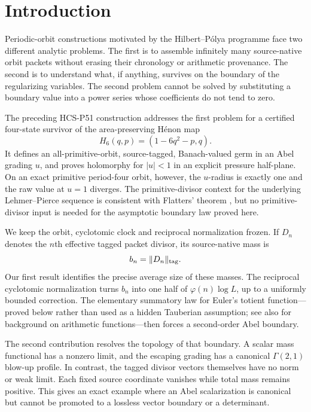 \section{Introduction}

Periodic-orbit constructions motivated by the Hilbert--P\'olya programme face
two different analytic problems.  The first is to assemble infinitely many
source-native orbit packets without erasing their chronology or arithmetic
provenance.  The second is to understand what, if anything, survives on the
boundary of the regularizing variables.  The second problem cannot be solved
by substituting a boundary value into a power series whose coefficients do
not tend to zero.

The preceding HCS-P51 construction \cite{wangp51} addresses the first problem
for a certified four-state survivor of the area-preserving H\'enon map
\[
H_6(q,p)=(1-6q^2-p,q).
\]
It defines an all-primitive-orbit, source-tagged, Banach-valued germ in an
Abel grading $u$, and proves holomorphy for $|u|<1$ in an explicit pressure
half-plane.  On an exact primitive period-four orbit, however, the $u$-radius
is exactly one and the raw value at $u=1$ diverges.  The primitive-divisor
context for the underlying Lehmer--Pierce sequence is consistent with
Flatters' theorem \cite{flatters2009}, but no primitive-divisor input is
needed for the asymptotic boundary law proved here.

We keep the orbit, cyclotomic clock and reciprocal normalization frozen.  If
$D_n$ denotes the $n$th effective tagged packet divisor, its source-native
mass is
\[
b_n=\|D_n\|_{\rm tag}.
\]
Our first result identifies the precise average size of these masses.  The
reciprocal cyclotomic normalization turns $b_n$ into one half of
$\varphi(n)\log L$, up to a uniformly bounded correction.  The elementary
summatory law for Euler's totient function---proved below rather than used as
a hidden Tauberian assumption; see also \cite[Chapter~3]{apostol1976} for
background on arithmetic functions---then forces a second-order Abel
boundary.

The second contribution resolves the topology of that boundary.  A scalar
mass functional has a nonzero limit, and the escaping grading has a canonical
$\Gamma(2,1)$ blow-up profile.  In contrast, the tagged divisor vectors
themselves have no norm or weak limit.  Each fixed source coordinate vanishes
while total mass remains positive.  This gives an exact example where an Abel
scalarization is canonical but cannot be promoted to a lossless vector
boundary or a determinant.

